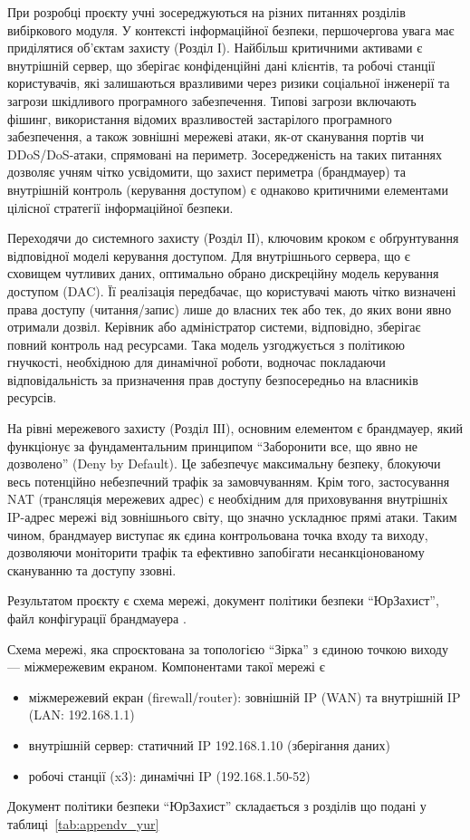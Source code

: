 При розробці проєкту учні зосереджуються на різних питаннях розділів вибіркового модуля. У контексті інформаційної безпеки, першочергова увага має приділятися об'єктам захисту (Розділ І). Найбільш критичними активами є внутрішній сервер, що зберігає конфіденційні дані клієнтів, та робочі станції користувачів, які залишаються вразливими через ризики соціальної інженерії та загрози шкідливого програмного забезпечення. Типові загрози включають фішинг, використання відомих вразливостей застарілого програмного забезпечення, а також зовнішні мережеві атаки, як-от сканування портів чи DDoS/DoS-атаки, спрямовані на периметр. Зосередженість на таких питаннях дозволяє учням чітко усвідомити, що захист периметра (брандмауер) та внутрішній контроль (керування доступом) є однаково критичними елементами цілісної стратегії інформаційної безпеки.

Переходячи до системного захисту (Розділ ІІ), ключовим кроком є обґрунтування відповідної моделі керування доступом. Для внутрішнього сервера, що є сховищем чутливих даних, оптимально обрано дискреційну модель керування доступом (DAC). Її реалізація передбачає, що користувачі мають чітко визначені права доступу (читання/запис) лише до власних тек або тек, до яких вони явно отримали дозвіл. Керівник або адміністратор системи, відповідно, зберігає повний контроль над ресурсами. Така модель узгоджується з політикою гнучкості, необхідною для динамічної роботи, водночас покладаючи відповідальність за призначення прав доступу безпосередньо на власників ресурсів.

На рівні мережевого захисту (Розділ ІІІ), основним елементом є брандмауер, який функціонує за фундаментальним принципом ``Заборонити все, що явно не дозволено'' (Deny by Default). Це забезпечує максимальну безпеку, блокуючи весь потенційно небезпечний трафік за замовчуванням. Крім того, застосування NAT (трансляція мережевих адрес) є необхідним для приховування внутрішніх IP-адрес мережі від зовнішнього світу, що значно ускладнює прямі атаки. Таким чином, брандмауер виступає як єдина контрольована точка входу та виходу, дозволяючи моніторити трафік та ефективно запобігати несанкціонованому скануванню та доступу ззовні.

Результатом проєкту  є схема мережі, документ політики безпеки ``ЮрЗахист'', файл конфігурації брандмауера .

Схема мережі, яка спроєктована за топологією ``Зірка'' з єдиною точкою виходу — міжмережевим екраном. Компонентами такої мережі є 
\begin{itemize}
    \item міжмережевий екран (firewall/router): зовнішній IP (WAN) та внутрішній IP (LAN: 192.168.1.1)
    \item внутрішній сервер: статичний IP 192.168.1.10 (зберігання даних)
    \item робочі станції (x3): динамічні IP (192.168.1.50-52)
\end{itemize}
Документ політики безпеки ``ЮрЗахист'' складається з розділів що подані у таблиці~\ref{tab:appendv_yur}


